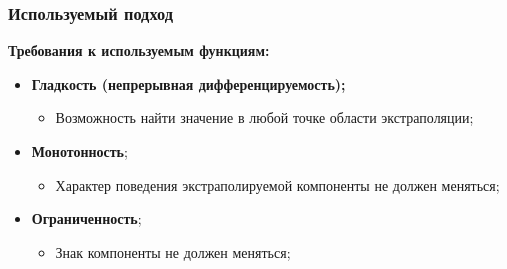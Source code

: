 \documentclass[svgnames] {beamer}
\begin{document}
\begin{frame}
  \frametitle{Используемый подход}
  \begin{block}{\bf \centering Требования к используемым функциям:}
    \begin{itemize}
      \item {\bf Гладкость (непрерывная дифференцируемость);}
        \begin{itemize}
        \item Возможность найти значение в любой точке области экстраполяции;
        \end{itemize}
      \item {\bf Монотонность};
        \begin{itemize}
        \item Характер поведения экстраполируемой компоненты не должен меняться;
        \end{itemize}
      \item {\bf Ограниченность};
        \begin{itemize}
        \item Знак компоненты не должен меняться;
        \end{itemize}
    \end{itemize}
  \end{block}
\end{frame}
\end{document}
